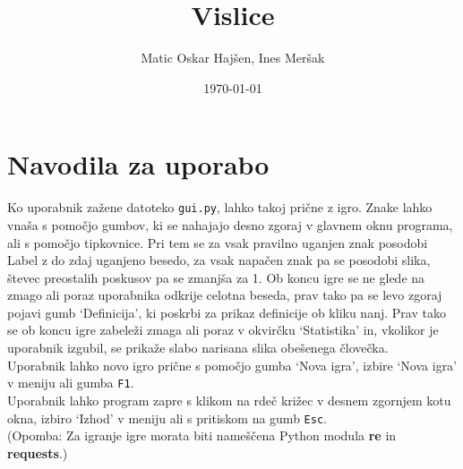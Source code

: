 \documentclass [a4paper, 12pt] {article}
\title {Vislice}
\author {Matic Oskar Hajšen, Ines Meršak}
\date {\today}
\begin{document}
\maketitle
\tableofcontents

\newpage

\section {Navodila za uporabo}
Ko uporabnik zažene datoteko \texttt {gui.py}, lahko takoj prične z igro. Znake lahko vnaša s pomočjo gumbov, ki se nahajajo desno zgoraj v glavnem oknu programa, ali s pomočjo tipkovnice. Pri tem se za vsak pravilno uganjen znak posodobi Label z do zdaj uganjeno besedo, za vsak napačen znak pa se posodobi slika, števec preostalih poskusov pa se zmanjša za 1. Ob koncu igre se ne glede na zmago ali poraz uporabnika odkrije celotna beseda, prav tako pa se levo zgoraj pojavi gumb `Definicija', ki poskrbi za prikaz definicije ob kliku nanj. Prav tako se ob koncu igre zabeleži zmaga ali poraz v okvirčku `Statistika' in, vkolikor je uporabnik izgubil, se prikaže slabo narisana slika obešenega človečka. \\
Uporabnik lahko novo igro prične s pomočjo gumba `Nova igra', izbire `Nova igra' v meniju ali gumba \texttt {F1}. \\
Uporabnik lahko program zapre s klikom na rdeč križec v desnem zgornjem kotu okna, izbiro `Izhod' v meniju ali s pritiskom na gumb \texttt {Esc}. \\
(Opomba: Za igranje igre morata biti nameščena Python modula \textbf {re} in \textbf {requests}.)
\end{document}

